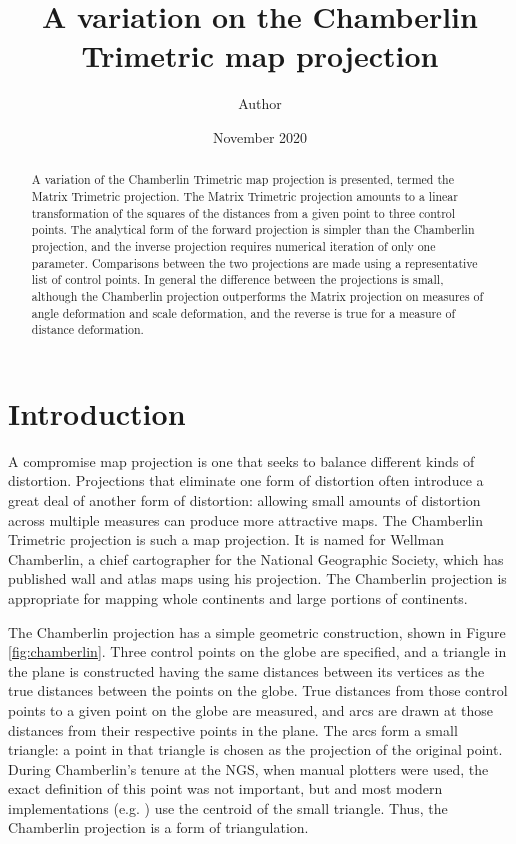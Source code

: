 \documentclass[]{interact}
\title{A variation on the Chamberlin Trimetric map projection}
\author{Author}
\date{November 2020}
\begin{document}
\begin{abstract}
   A variation of the Chamberlin Trimetric map projection is presented,
   termed the Matrix Trimetric projection. The Matrix Trimetric projection
   amounts to a linear transformation of the squares of the distances from a
   given point to three control points. The analytical form of the forward
   projection is simpler than the Chamberlin projection, and the inverse
   projection requires numerical iteration of only one parameter. Comparisons
   between the two projections are made using a representative list of control
   points. In general the difference between the projections is small,
   although the Chamberlin projection outperforms the Matrix projection on
   measures of angle deformation and scale deformation,
   and the reverse is true for a measure of distance deformation. %

\end{abstract}
\maketitle

\section{Introduction}
A compromise map projection is one that seeks to balance different kinds of distortion.
Projections that eliminate one form of distortion often
introduce a great deal of another form of distortion: allowing small
amounts of distortion across multiple measures can produce more attractive maps.
The Chamberlin Trimetric projection is such a map projection. It is named for
Wellman Chamberlin, a chief cartographer for the National Geographic
Society, which has published wall and atlas maps using his projection. The
Chamberlin projection is appropriate for mapping whole continents and large
portions of continents. \citep{christensen}

The Chamberlin projection has a simple geometric construction, shown in Figure
\ref{fig:chamberlin}. Three control points on the globe are specified, and a
triangle in the plane is constructed having the same distances between its
vertices as the true distances between the points on the globe. True distances
from those control points to a given point on the globe are measured, and arcs
are drawn at those distances from their respective points in the plane. The arcs
form a small triangle: a point in that triangle is chosen as the projection of
the original point. During Chamberlin's tenure at the NGS, when manual plotters
were used, the exact definition of this point was not important,
but \citet{christensen} and most modern implementations
(e.g. \citealp{proj}) use the centroid of the small triangle.
Thus, the Chamberlin projection is a form of triangulation. \citep{snyder89}
\end{document}
